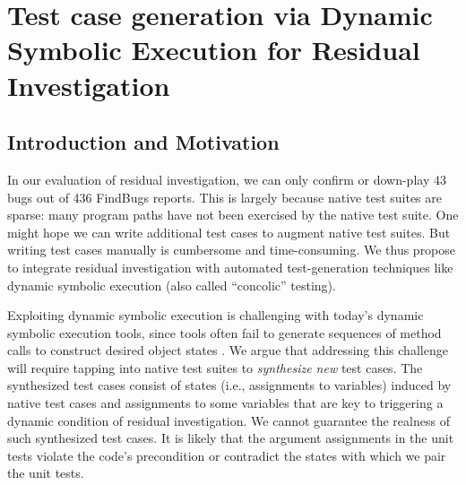 \section{Test case generation via Dynamic Symbolic Execution for Residual Investigation}

\subsection{Introduction and Motivation}

In our evaluation of residual investigation, we can only confirm or down-play 43 bugs out of 436 FindBugs reports. This is largely because native test suites are sparse: many program paths have not been exercised by the native test suite. One might hope we can write additional test cases to augment native test suites. But writing test cases manually is cumbersome and time-consuming. We thus propose to integrate residual investigation with automated test-generation techniques like dynamic symbolic execution (also called ``concolic'' testing).

Exploiting dynamic symbolic execution is challenging with today's dynamic symbolic execution tools, since tools often fail to generate sequences of method calls to construct desired object states \cite{Xiao:2011:PIP:1985793.1985876}.
 We argue that addressing this challenge will require tapping into native test suites to \emph{synthesize new} test cases. The synthesized test cases consist of states (i.e., assignments to variables) induced by native test cases and assignments to some variables that are key to triggering a dynamic condition of residual investigation.  
 We cannot guarantee the realness of such synthesized test cases. It is likely that the argument assignments in the unit tests violate the code's precondition or contradict the states with which we pair the unit tests.  

